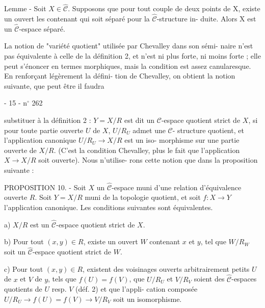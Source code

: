 Lemme - Soit $X \in \hat{\mathcal{C}}$. Supposons que pour tout couple de deux points de X,
existe un ouvert les contenant qui soit séparé pour la $\hat{\mathcal{C}}$-structure in-
duite. Alors X est un $\hat{\mathcal{C}}$-espace séparé.

La notion de "variété quotient" utilisée par Chevalley dans son sémi-
naire n'est pas équivalente à celle de la définition 2, et n'est ni plus
forte, ni moins forte ; elle peut s'énoncer en termes morphiques, mais
la condition est assez canularesque. En renforçant légèrement la défini-
tion de Chevalley, on obtient la notion suivante, que peut être il faudra

\newpage



\begin{center}
- 15 - \hfill n$^{\circ}$ 262
\end{center}

substituer à la définition 2 : $Y = X/R$ est dit un $\mathcal{C}$-espace quotient
strict de $X$, si pour toute partie ouverte $U$ de $X$, $U/R_U$ admet une $\mathcal{C}$-
structure quotient, et l'application canonique $U/R_U \to X/R$ est un iso-
morphisme sur une partie ouverte de $X/R$. (C'est la condition Chevalley,
plus le fait que l'application $X \to X/R$ soit ouverte). Nous n'utilise-
rons cette notion que dans la proposition suivante :

PROPOSITION 10. - Soit $X$ un $\hat{\mathcal{C}}$-espace muni d'une relation d'équivalence
ouverte $R$. Soit $Y = X/R$ muni de la topologie quotient, et soit $f : X \to Y$
l'application canonique. Les conditions suivantes sont équivalentes.

a) $X/R$ est un $\hat{\mathcal{C}}$-espace quotient strict de $X$.

b) Pour tout $(x,y) \in R$, existe un ouvert $W$ contenant $x$ et $y$, tel que
$W/R_W$ soit un $\hat{\mathcal{C}}$-espace quotient strict de $W$.

c) Pour tout $(x,y) \in R$, existent des voisinages ouverts arbitrairement
petits $U$ de $x$ et $V$ de $y$, tels que $f(U) = f(V)$, que $U/R_U$ et $V/R_V$
soient des $\hat{\mathcal{C}}$-espaces quotients de $U$ resp. $V$ (déf. 2) et que l'appli-
cation composée $U/R_U \to f(U) = f(V) \to V/R_V$ soit un isomorphisme.

